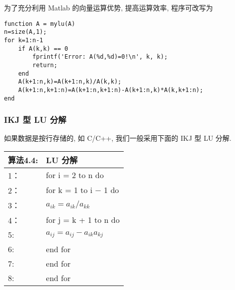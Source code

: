 \documentclass[12pt,a4paper]{article}
\begin{document}
为了充分利用 Matlab 的向量运算优势, 提高运算效率, 程序可改写为
\begin{lstlisting}[language={[ANSI]C}] 
% Matlab code 2 : LU 分解
function A = mylu(A)
n=size(A,1);
for k=1:n-1
	if A(k,k) == 0
		fprintf('Error: A(%d,%d)=0!\n', k, k);
		return;
	end
	A(k+1:n,k)=A(k+1:n,k)/A(k,k);
	A(k+1:n,k+1:n)=A(k+1:n,k+1:n)-A(k+1:n,k)*A(k,k+1:n);
end
\end{lstlisting}

\maketitle
\newpage

\subsubsection{IKJ 型 LU 分解}

如果数据是按行存储的, 如 C/C++, 我们一般采用下面的 IKJ 型 LU 分解.

\begin{table}  
	\begin{tabular*}{16cm}{ll}  
		\hline  
		算法4.4: & LU 分解 \\  
		\hline  
		1：   &for i = 2 to n do\\  
		2：   &\qquad for k = 1 to i − 1 do\\
		3：   &\qquad \qquad $a_{ik} = a_{ik}/a_{kk}$\\
		4：   &\qquad \qquad for j = k + 1 to n do\\
		5:    &\qquad \qquad \qquad $a_{ij} = a_{ij} − a_{ik}a_{kj}$\\
		6:    &\qquad \qquad end for\\
		7:    &\qquad end for\\
		8:    &end for \\
		\hline  
	\end{tabular*}  
\end{table} 
\end{document}
